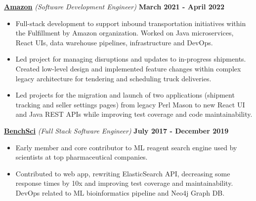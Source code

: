 \documentclass{article}
\begin{document}
{\bf{\underline{Amazon}} } \textit{(Software Development Engineer)} \hfill {\bf March 2021 - April 2022\/} 
\begin{itemize}[leftmargin=*]
    \itemsep0em
    \renewcommand\labelitemi{\tiny$\bullet$}
    \item Full-stack development to support inbound transportation initiatives within the Fulfillment by Amazon organization. Worked on Java microservices, React UIs, data warehouse pipelines, infrastructure and DevOps.
    \item Led project for managing disruptions and updates to in-progress shipments. Created low-level design and implemented feature changes within complex legacy architecture for tendering and scheduling truck deliveries.
    \item Led projects for the migration and launch of two applications (shipment tracking and seller settings pages) from legacy Perl Mason to new React UI and Java REST APIs while improving test coverage and code maintainability.
\end{itemize}

{\bf{\underline{BenchSci}} } \textit{(Full Stack Software Engineer)} \hfill {\bf July 2017 - December 2019 \/}
\begin{itemize}[leftmargin=*]
    \itemsep0em
    \renewcommand\labelitemi{\tiny$\bullet$}
    \item Early member and core contributor to ML reagent search engine used by scientists at top pharmaceutical companies.
    \item Contributed to web app, rewriting ElasticSearch API, decreasing some response times by 10x and improving test coverage and  maintainability. DevOps related to ML bioinformatics pipeline and Neo4j Graph DB.
\end{itemize}
\end{document}
